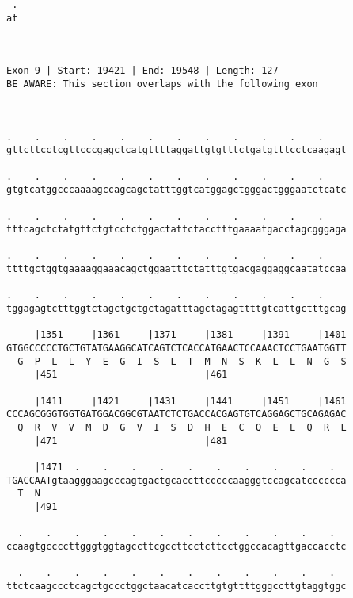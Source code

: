 \documentclass{article}
\begin{document}
\begin{Verbatim}
 .
at
  
  
 
Exon 9 | Start: 19421 | End: 19548 | Length: 127
BE AWARE: This section overlaps with the following exon



.    .    .    .    .    .    .    .    .    .    .    .    
gttcttcctcgttcccgagctcatgttttaggattgtgtttctgatgtttcctcaagagt
                                                            
.    .    .    .    .    .    .    .    .    .    .    .    
gtgtcatggcccaaaagccagcagctatttggtcatggagctgggactgggaatctcatc
                                                            
.    .    .    .    .    .    .    .    .    .    .    .    
tttcagctctatgttctgtcctctggactattctacctttgaaaatgacctagcgggaga
                                                            
.    .    .    .    .    .    .    .    .    .    .    .    
ttttgctggtgaaaaggaaacagctggaatttctatttgtgacgaggaggcaatatccaa
                                                            
.    .    .    .    .    .    .    .    .    .    .    .    
tggagagtctttggtctagctgctgctagatttagctagagttttgtcattgctttgcag
                                                            
     |1351     |1361     |1371     |1381     |1391     |1401
GTGGCCCCCTGCTGTATGAAGGCATCAGTCTCACCATGAACTCCAAACTCCTGAATGGTT
  G  P  L  L  Y  E  G  I  S  L  T  M  N  S  K  L  L  N  G  S
     |451                          |461                     
  
     |1411     |1421     |1431     |1441     |1451     |1461
CCCAGCGGGTGGTGATGGACGGCGTAATCTCTGACCACGAGTGTCAGGAGCTGCAGAGAC
  Q  R  V  V  M  D  G  V  I  S  D  H  E  C  Q  E  L  Q  R  L
     |471                          |481                     
  
     |1471  .    .    .    .    .    .    .    .    .    .  
TGACCAATgtaagggaagcccagtgactgcaccttcccccaagggtccagcatcccccca
  T  N                                                      
     |491                                                   
  
  .    .    .    .    .    .    .    .    .    .    .    .  
ccaagtgccccttgggtggtagccttcgccttcctcttcctggccacagttgaccacctc
                                                            
  .    .    .    .    .    .    .    .    .    .    .    .  
ttctcaagccctcagctgccctggctaacatcaccttgtgttttgggccttgtaggtggc
                                                            

\end{Verbatim}
\end{document}

